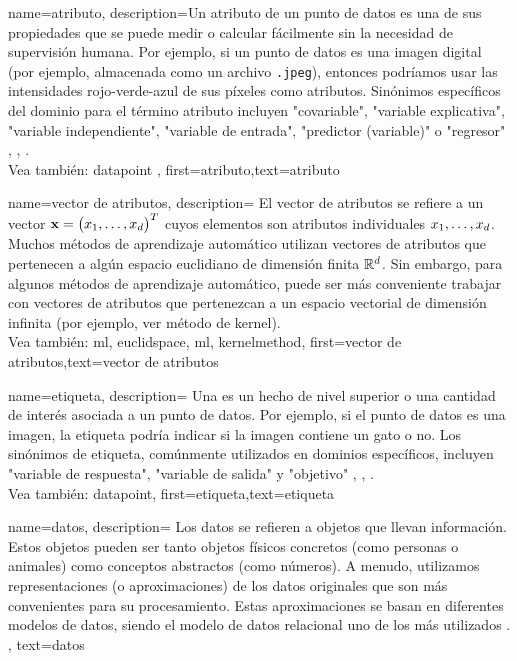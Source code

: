 {name={atributo},
	description={Un atributo de un punto de datos es una de sus propiedades que se puede 
		medir o calcular fácilmente sin la necesidad de supervisión humana. Por ejemplo, si un punto de datos
		es una imagen digital (por ejemplo, almacenada como un archivo \texttt{.jpeg}), entonces podríamos usar
		las intensidades rojo-verde-azul de sus píxeles como atributos. Sinónimos específicos del dominio  
		para el término atributo incluyen "covariable", "variable explicativa", "variable independiente", "variable de entrada", "predictor (variable)" o "regresor" \cite{Gujarati2021}, \cite{Dodge2003}, \cite{Everitt2022}. 
		\\
		Vea también: \gls{datapoint} }, 
		first={atributo},text={atributo}  
}

{
	name={vector de atributos},
	description={
		El vector de atributos se refiere a un vector 
		${\bf x} = \big(x_{1},\ldots,x_{d}\big)^{T}$ cuyos elementos son atributos individuales 
		$x_{1},\ldots,x_{d}$. 
		Muchos métodos de aprendizaje automático utilizan vectores de atributos que pertenecen a algún 
		espacio euclidiano de dimensión finita $\mathbb{R}^{d}$. Sin embargo, para algunos 
		métodos de aprendizaje automático, puede ser más conveniente trabajar con vectores de atributos que pertenezcan 
		a un espacio vectorial de dimensión infinita (por ejemplo, ver método de kernel). 
		\\
		Vea también: \gls{ml}, \gls{euclidspace}, \gls{ml}, \gls{kernelmethod}},
	first={vector de atributos},text={vector de atributos}  
}

{
	name={etiqueta},
	description={
		Una es un hecho de nivel superior o una cantidad de interés asociada a un punto de datos. 
		Por ejemplo, si el punto de datos es una imagen, la etiqueta podría indicar si la 
		imagen contiene un gato o no. Los sinónimos de etiqueta, comúnmente utilizados en dominios específicos, 
		incluyen "variable de respuesta", "variable de salida" y "objetivo" \cite{Gujarati2021}, \cite{Dodge2003}, \cite{Everitt2022}.
		\\
		Vea también: \gls{datapoint}},
	first={etiqueta},text={etiqueta}  
}

{
	name={datos},
	description={
		Los datos se refieren a objetos que llevan información. 
		Estos objetos pueden ser tanto objetos físicos concretos (como personas o animales) 
		como conceptos abstractos (como números). 
		A menudo, utilizamos representaciones (o aproximaciones) de los datos originales que son 
		más convenientes para su procesamiento. Estas aproximaciones se basan en diferentes 
		modelos de datos, siendo el modelo de datos relacional uno de los más utilizados \cite{codd1970relational}.
	}, 
	text={datos}
}


